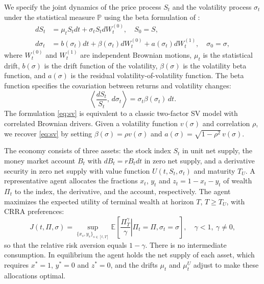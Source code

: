 \documentclass[11pt]{article}
\theoremstyle{remark}
\newcommand{\E}{\mathbb{E}}
\newcommand{\PP}{\mathbb{P}}
\begin{document}
We specify the joint dynamics of the price process $S_{t}$ and the volatility process $\sigma_{t}$ under the statistical measure $\PP$ using the beta formulation of \cite{KarasinskiSepp2012}:
\begin{equation}\label{eq:sv}
\begin{split}
dS_{t} &= \mu_{t} S_{t} dt+ \sigma_{t}S_{t} dW^{(0)}_{t}, \quad S_0=S, \\
d\sigma_{t}&=b(\sigma_{t}) dt + \beta(\sigma_{t}) dW^{(0)}_{t} + a(\sigma_{t}) dW^{(1)}_{t} , \quad \sigma_{0}=\sigma,
\end{split}
\end{equation}
where $W^{(0)}_{t}$ and $W^{(1)}_{t}$ are independent Brownian motions, $\mu_{t}$ is the statistical drift, $b(\sigma)$ is the drift function of the volatility, $\beta(\sigma)$ is the volatility beta function, and $a(\sigma)$ is the residual volatility-of-volatility function. The beta function specifies the covariation between returns and volatility changes:
\begin{equation}\label{eq:covar}
\left\langle  \frac{dS_{t}}{S_{t}},\, d\sigma_{t} \right\rangle =  \sigma_{t} \beta(\sigma_{t})\, dt.
\end{equation}
The formulation \eqref{eq:sv} is equivalent to a classic two-factor SV model with correlated Brownian drivers. Given a volatility function $v(\sigma)$ and correlation $\rho$, we recover \eqref{eq:sv} by setting $\beta(\sigma)=\rho v(\sigma)$ and $a(\sigma)=\sqrt{1-\rho^{2}}\,v(\sigma)$.

The economy consists of three assets: the stock index $S_{t}$ in unit net supply, the money market account $B_{t}$ with $dB_{t}=rB_{t}dt$ in zero net supply, and a derivative security in zero net supply with value function $U(t, S_{t}, \sigma_{t})$ and maturity $T_{U}$. A representative agent allocates the fractions $x_{t}$, $y_{t}$ and $z_{t}=1-x_{t}-y_{t}$ of wealth $\Pi_{t}$ to the index, the derivative, and the account, respectively. The agent maximizes the expected utility of terminal wealth at horizon $T$, $T \geq T_{U}$, with CRRA preferences:
\begin{equation}\label{eq:objective}
J(t, \Pi, \sigma) = \sup_{ \{x_{s}, y_{s}\}_{s \in [t,T]} } \E\left[ \left. \frac{\Pi_{T}^{\gamma}}{\gamma} \right| \Pi_{t}=\Pi, \sigma_{t}=\sigma \right], \quad \gamma<1, \ \gamma \neq 0,
\end{equation}
so that the relative risk aversion equals $1-\gamma$. There is no intermediate consumption. In equilibrium the agent holds the net supply of each asset, which requires $x^{*}=1$, $y^{*}=0$ and $z^{*}=0$, and the drifts $\mu_{t}$ and $\mu^{U}_{t}$ adjust to make these allocations optimal.
\end{document}
